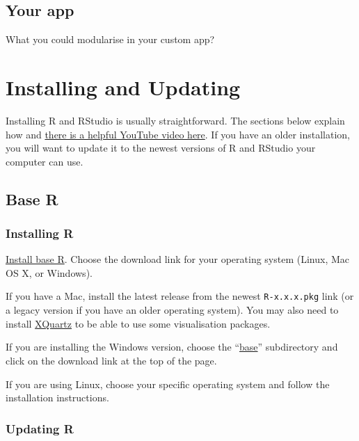 \documentclass[
  oneside]{book}
\begin{document}
\hypertarget{your-app-modules}{%
\section{Your app}\label{your-app-modules}}

What you could modularise in your custom app?

\hypertarget{appendix-appendices}{%
\appendix}


\hypertarget{installing-r}{%
\chapter{Installing and Updating}\label{installing-r}}

Installing R and RStudio is usually straightforward. The sections below explain how and \href{https://www.youtube.com/watch?v=lVKMsaWju8w}{there is a helpful YouTube video here}. If you have an older installation, you will want to update it to the newest versions of R and RStudio your computer can use.

\hypertarget{base-r}{%
\section{Base R}\label{base-r}}

\hypertarget{installing-r-1}{%
\subsection{Installing R}\label{installing-r-1}}

\href{https://cran.rstudio.com/}{Install base R}. Choose the download link for your operating system (Linux, Mac OS X, or Windows).

If you have a Mac, install the latest release from the newest \texttt{R-x.x.x.pkg} link (or a legacy version if you have an older operating system). You may also need to install \href{http://xquartz.macosforge.org/}{XQuartz} to be able to use some visualisation packages.

If you are installing the Windows version, choose the ``\href{https://cran.rstudio.com/bin/windows/base/}{base}'' subdirectory and click on the download link at the top of the page.

If you are using Linux, choose your specific operating system and follow the installation instructions.

\hypertarget{updating-r}{%
\subsection{Updating R}\label{updating-r}}
\end{document}
